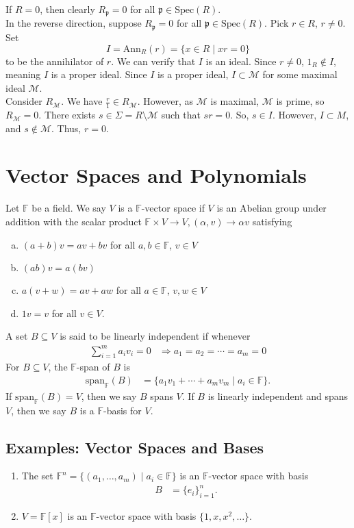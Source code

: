 \documentclass[10pt]{extarticle}
\begin{document}
  If $R = 0$, then clearly $R_{\mathfrak{p}} = 0$ for all $\mathfrak{p}\in \text{Spec}(R)$.\\

  In the reverse direction, suppose $R_\mathfrak{p} = 0$ for all $\mathfrak{p}\in \text{Spec}(R)$. Pick $r\in R$, $r\neq 0$. Set $$I = \text{Ann}_{R}(r) = \{x\in R\mid xr = 0\}$$ to be the annihilator of $r$. We can verify that $I$ is an ideal. Since $r\neq 0$, $1_R\notin I$, meaning $I$ is a proper ideal. Since $I$ is a proper ideal, $I\subset \mathcal{M}$ for some maximal ideal $\mathcal{M}$.\\

  Consider $R_{\mathcal{M}}$. We have $\frac{r}{1}\in R_{\mathcal{M}}$. However, as $\mathcal{M}$ is maximal, $\mathcal{M}$ is prime, so $R_{\mathcal{M}} = 0$. There exists $s\in \Sigma = R\setminus\mathcal{M}$ such that $sr = 0$. So, $s\in I$. However, $I\subset M$, and $s\notin \mathcal{M}$. Thus, $r = 0$.
  \section{Vector Spaces and Polynomials}%
  Let $\mathbb{F}$ be a field. We say $V$ is a $\mathbb{F}$-vector space if $V$ is an Abelian group under addition with the scalar product $\mathbb{F}\times V \rightarrow V,(\alpha,v)\rightarrow \alpha v$ satisfying
  \begin{enumerate}[(a)]
    \item $(a + b)v = av + bv$ for all $a,b\in \mathbb{F}$, $v\in V$
    \item $(ab)v = a(bv)$
    \item $a(v+w) = av + aw$ for all $a\in \mathbb{F}$, $v,w\in V$
    \item $1v = v$ for all $v\in V$.
  \end{enumerate}
  A set $B\subseteq V$ is said to be linearly independent if whenever 
  \begin{align*}
    \sum_{i=1}^{m}a_iv_i = 0 &\Rightarrow a_1 = a_2 = \cdots = a_m = 0
  \end{align*}
  For $B\subseteq V$, the $\mathbb{F}$-span of $B$ is
  \begin{align*}
    \text{span}_{\mathbb{F}}(B) &= \{a_1v_1 + \cdots + a_mv_m\mid a_i\in \mathbb{F}\}.
  \end{align*}
  If $\text{span}_{\mathbb{F}}(B) = V$, then we say $B$ spans $V$. If $B$ is linearly independent and spans $V$, then we say $B$ is a $\mathbb{F}$-basis for $V$.
  \subsection{Examples: Vector Spaces and Bases}%
  \begin{enumerate}[(1)]
    \item The set $\mathbb{F}^{n} = \{(a_1,\dots,a_m)\mid a_i\in \mathbb{F}\}$ is an $\mathbb{F}$-vector space with basis
      \begin{align*}
        B &= \{e_i\}_{i=1}^{n}.
      \end{align*}
    \item $V = \mathbb{F}[x]$ is an $\mathbb{F}$-vector space with basis $\{1,x,x^2,\dots\}$.
  \end{enumerate}
\end{document}

